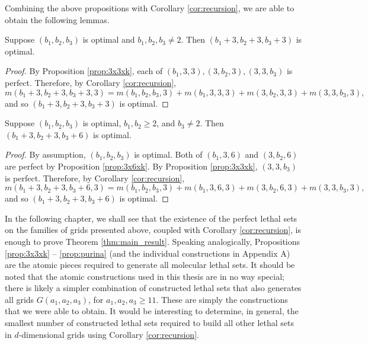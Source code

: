Combining the above propositions with Corollary \ref{cor:recursion}, we are able to obtain the following lemmas.

\begin{lem}
\label{lem:plus_333}
Suppose $(b_1, b_2, b_3)$ is optimal and $b_1,b_2,b_3 \neq 2$. Then $(b_1+3, b_2+3, b_3+3)$ is optimal. 
\end{lem}

\begin{proof}
By Proposition \ref{prop:3x3xk}, each of $(b_1,3,3), (3,b_2,3),(3,3,b_3)$ is perfect. Therefore, by Corollary \ref{cor:recursion}, 
$$m(b_1+3, b_2+3, b_3+3, 3) = m(b_1,b_2,b_3,3) + m(b_1,3,3,3) + m(3,b_2,3,3) + m(3,3,b_3,3),$$
and so $(b_1+3, b_2+3, b_3+3)$ is optimal.
\end{proof}

\begin{lem}
\label{lem:plus_336}
Suppose $(b_1, b_2, b_3)$ is optimal, $b_1,b_2 \geq 2$, and $b_3 \neq 2$. Then $(b_1+3, b_2+3, b_3+6)$ is optimal. 
\end{lem}

\begin{proof}
By assumption, $(b_1,b_2,b_3)$ is optimal. Both of $(b_1,3,6)$ and $(3,b_2,6)$ are perfect by Proposition \ref{prop:3x6xk}. By Proposition \ref{prop:3x3xk}, $(3,3,b_3)$ is perfect. Therefore, by Corollary \ref{cor:recursion}, 
$$m(b_1+3, b_2+3, b_3+6, 3) = m(b_1,b_2,b_3,3) + m(b_1,3,6,3) + m(3,b_2,6,3) + m(3,3,b_3,3),$$
and so $(b_1+3, b_2+3, b_3+6)$ is optimal.
\end{proof}

In the following chapter, we shall see that the existence of the perfect lethal sets on the families of grids presented above, coupled with Corollary \ref{cor:recursion}, is enough to prove Theorem \ref{thm:main_result}. Speaking analogically, Propositions \ref{prop:3x3xk} -- \ref{prop:purina} (and the individual constructions in Appendix A) are the atomic pieces required to generate all molecular lethal sets. It should be noted that the atomic constructions used in this thesis are in no way special; there is likely a simpler combination of constructed lethal sets that also generates all grids $G(a_1,a_2,a_3)$, for $a_1,a_2,a_3 \geq 11$. These are simply the constructions that we were able to obtain. It would be interesting to determine, in general, the smallest number of constructed lethal sets required to build all other lethal sets in $d$-dimensional grids using Corollary \ref{cor:recursion}. 


